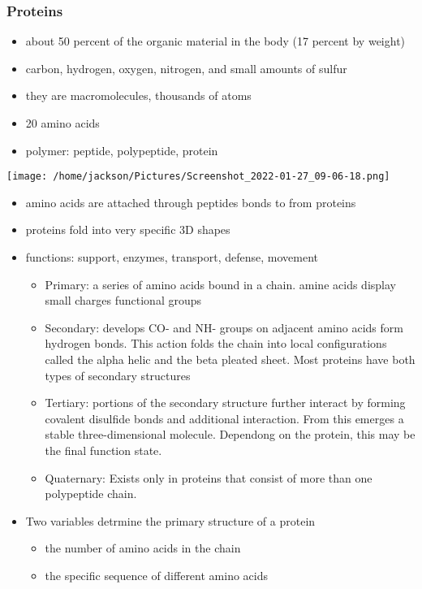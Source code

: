 \documentclass[11pt]{article}
\begin{document}
\subsubsection{Proteins}
\label{sec:org03e0d5f}
\begin{itemize}
\item about 50 percent of the organic material in the body (17 percent by weight)
\item carbon, hydrogen, oxygen, nitrogen, and small amounts of sulfur
\item they are macromolecules, thousands of atoms
\item 20 amino acids
\item polymer: peptide, polypeptide, protein
\end{itemize}
\begin{center}
\texttt{[image: /home/jackson/Pictures/Screenshot\_2022-01-27\_09-06-18.png]}
\end{center}
\begin{itemize}
\item amino acids are attached through peptides bonds to from proteins
\item proteins fold into very specific 3D shapes
\item functions: support, enzymes, transport, defense, movement
\begin{itemize}
\item Primary: a series of amino acids bound in a chain. amine acids display small charges functional groups
\item Secondary: develops CO- and NH- groups on adjacent amino acids form hydrogen bonds. This action folds the chain into local configurations called the alpha helic and the beta pleated sheet. Most proteins have both types of secondary structures
\item Tertiary: portions of the secondary structure further interact by forming covalent disulfide bonds and additional interaction. From this emerges a stable three-dimensional molecule. Dependong on the protein, this may be the final function state.
\item Quaternary: Exists only in proteins that consist of more than one polypeptide chain.
\end{itemize}
\item Two variables detrmine the primary structure of a protein
\begin{itemize}
\item the number of amino acids in the chain
\item the specific sequence of different amino acids
\end{itemize}
\end{itemize}
\end{document}
